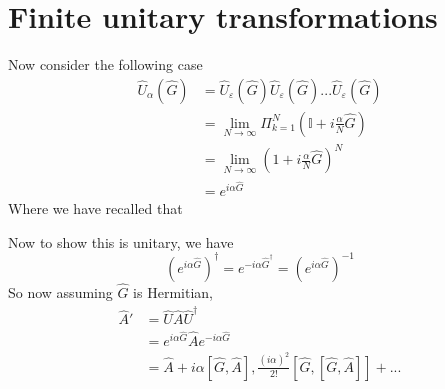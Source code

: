 \documentclass[a4paper, 11pt]{article}
\begin{document}
\section*{Finite unitary transformations}
	Now consider the following case
		\begin{align*}
			\hat{U}_\alpha(\hat{G}) &= \hat{U}_\varepsilon(\hat{G})\hat{U}_\varepsilon(\hat{G})...\hat{U}_\varepsilon(\hat{G})\\ 
			&= \lim\limits_{N\to\infty}\Pi_{k=1}^N(\mathbb{I}+i\frac{\alpha}{N}\hat{G}) \\
			&= \lim\limits_{N\to\infty} (1+i\frac{\alpha}{N}\hat{G})^N \\ 
			&= e^{i\alpha\hat{G}}
		\end{align*}
		Where we have recalled that
		
		Now to show this is unitary, we have 
		\begin{equation*}
		(e^{i\alpha\hat{G}})^\dagger = e^{-i\alpha\hat{G}^\dagger} = (e^{i\alpha\hat{G}})^{-1}
		\end{equation*}
		So now assuming $\hat{G}$ is Hermitian, 
		\begin{align*}
			\hat{A}' &= \hat{U}\hat{A}\hat{U}^\dagger \\ 
				&= e^{i\alpha\hat{G}}\hat{A}e^{-i\alpha\hat{G}} \\ 
				&= \hat{A}+i\alpha[\hat{G},\hat{A}], \frac{(i\alpha)^2}{2!}[\hat{G},[\hat{G}, \hat{A}]] + ... 
		\end{align*}
\end{document}

